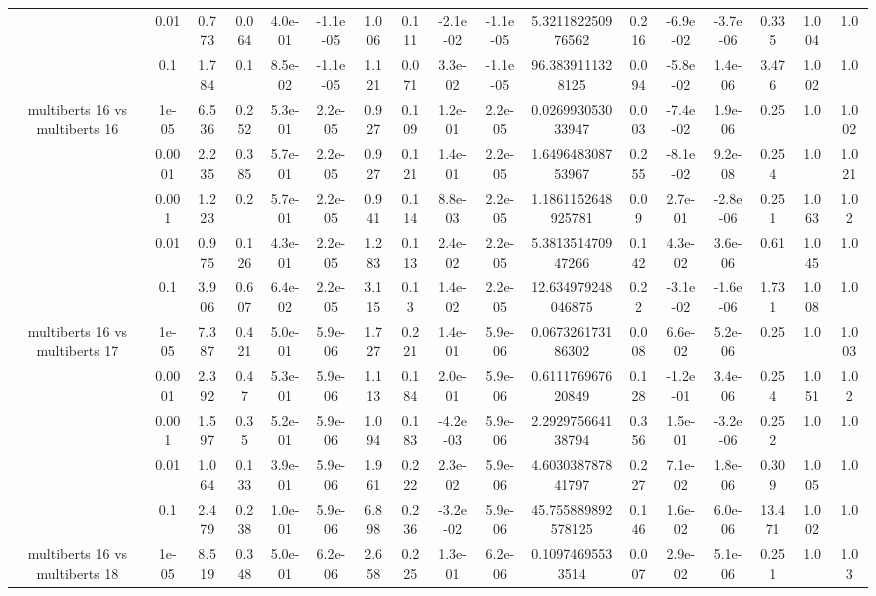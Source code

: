 \begin{tabular}{|c|c|c|c|c|c|c|c|c|c|c|c|c|c|c|c|c|}
 & 0.01 & 0.773 & 0.064 & 4.0e-01 & -1.1e-05 & 1.006 & 0.111 & -2.1e-02 & -1.1e-05 & 5.321182250976562 & 0.216 & -6.9e-02 & -3.7e-06 & 0.335 & 1.004 & 1.0 \\
 & 0.1 & 1.784 & 0.1 & 8.5e-02 & -1.1e-05 & 1.121 & 0.071 & 3.3e-02 & -1.1e-05 & 96.3839111328125 & 0.094 & -5.8e-02 & 1.4e-06 & 3.476 & 1.002 & 1.0 \\
\hline
\multirow{5}{*}{multiberts 16 vs multiberts 16} & 1e-05 & 6.536 & 0.252 & 5.3e-01 & 2.2e-05 & 0.927 & 0.109 & 1.2e-01 & 2.2e-05 & 0.026993053033947 & 0.003 & -7.4e-02 & 1.9e-06 & 0.25 & 1.0 & 1.002 \\
 & 0.0001 & 2.235 & 0.385 & 5.7e-01 & 2.2e-05 & 0.927 & 0.121 & 1.4e-01 & 2.2e-05 & 1.649648308753967 & 0.255 & -8.1e-02 & 9.2e-08 & 0.254 & 1.0 & 1.021 \\
 & 0.001 & 1.223 & 0.2 & 5.7e-01 & 2.2e-05 & 0.941 & 0.114 & 8.8e-03 & 2.2e-05 & 1.1861152648925781 & 0.09 & 2.7e-01 & -2.8e-06 & 0.251 & 1.063 & 1.02 \\
 & 0.01 & 0.975 & 0.126 & 4.3e-01 & 2.2e-05 & 1.283 & 0.113 & 2.4e-02 & 2.2e-05 & 5.381351470947266 & 0.142 & 4.3e-02 & 3.6e-06 & 0.61 & 1.045 & 1.0 \\
 & 0.1 & 3.906 & 0.607 & 6.4e-02 & 2.2e-05 & 3.115 & 0.13 & 1.4e-02 & 2.2e-05 & 12.634979248046875 & 0.22 & -3.1e-02 & -1.6e-06 & 1.731 & 1.008 & 1.0 \\
\hline
\multirow{5}{*}{multiberts 16 vs multiberts 17} & 1e-05 & 7.387 & 0.421 & 5.0e-01 & 5.9e-06 & 1.727 & 0.221 & 1.4e-01 & 5.9e-06 & 0.067326173186302 & 0.008 & 6.6e-02 & 5.2e-06 & 0.25 & 1.0 & 1.003 \\
 & 0.0001 & 2.392 & 0.47 & 5.3e-01 & 5.9e-06 & 1.113 & 0.184 & 2.0e-01 & 5.9e-06 & 0.611176967620849 & 0.128 & -1.2e-01 & 3.4e-06 & 0.254 & 1.051 & 1.02 \\
 & 0.001 & 1.597 & 0.35 & 5.2e-01 & 5.9e-06 & 1.094 & 0.183 & -4.2e-03 & 5.9e-06 & 2.292975664138794 & 0.356 & 1.5e-01 & -3.2e-06 & 0.252 & 1.0 & 1.0 \\
 & 0.01 & 1.064 & 0.133 & 3.9e-01 & 5.9e-06 & 1.961 & 0.222 & 2.3e-02 & 5.9e-06 & 4.603038787841797 & 0.227 & 7.1e-02 & 1.8e-06 & 0.309 & 1.005 & 1.0 \\
 & 0.1 & 2.479 & 0.238 & 1.0e-01 & 5.9e-06 & 6.898 & 0.236 & -3.2e-02 & 5.9e-06 & 45.755889892578125 & 0.146 & 1.6e-02 & 6.0e-06 & 13.471 & 1.002 & 1.0 \\
\hline
\multirow{5}{*}{multiberts 16 vs multiberts 18} & 1e-05 & 8.519 & 0.348 & 5.0e-01 & 6.2e-06 & 2.658 & 0.225 & 1.3e-01 & 6.2e-06 & 0.10974695533514 & 0.007 & 2.9e-02 & 5.1e-06 & 0.251 & 1.0 & 1.03 \\

\end{tabular}

